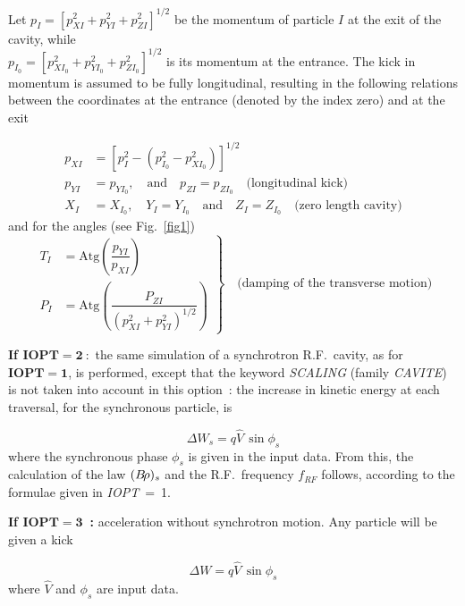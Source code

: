 \noindent Let   $ p_I= \left[p^2_{XI}+p^2_{YI}+p^2_{ZI} \right]^{1/2} $ be the momentum of particle 
$ I $ at the exit of the cavity, while \\ %
$ p_{I_0}= \left[p^2_{XI_0}+p^2_{YI_0} + p^2_{ZI_0}\right]^{1/2} $ is its 
momentum at the entrance. The kick in momentum is assumed to be 
fully longitudinal, resulting in the following relations between 
the coordinates at the entrance (denoted by the index zero) and at the exit 

 \begin{align*}
	 p_{XI} 
	      & = \left[p^2_I-(p^2_{I_0}-p^2_{XI_0}) \right]^{1/2} \\
	p_{YI} & = p_{YI_0},\quad \text{and} \quad  p_{ZI}= p_{ZI_0} \quad\text{(longitudinal  kick)} \\ 
	X_I &  = X_{I_0},\quad Y_I=Y_{I_0}\quad  \text{and} 
	        \quad Z_I=Z_{I_0} \quad\text{(zero  length cavity)}   
 \end{align*}
%
and for the angles (see Fig.~\ref{fig1})  
%
\begin{equation*}
	\left. 
	\begin{aligned}
		T_I & =  \text{Atg} \left( \dfrac{p_{YI}}{ p_{XI}} \right) \\
		P_I &  =  \text{Atg} \left(\dfrac{P_{ZI}}{(p^2_{XI}+p^2_{YI})^{1/2}} \right) 
	\end{aligned}
	 \right\rbrace \quad \text{(damping  of the  transverse  motion)}
\end{equation*}  

\noindent\textbf{If $\mathbf{IOPT  =  2~:}$} the same simulation of a synchrotron R.F.\ cavity, 
as for $\mathbf{IOPT  =  1}$, is performed, except that the keyword 
\textsl{SCALING} (family \textsl{CAVITE}) is not taken into 
account in this option~: the increase in kinetic energy at each traversal, 
for the synchronous particle, is

$$ \Delta W_s= q\hat  V \,\sin\phi_ s $$
%
where the synchronous phase $ \phi_ s $ is given in the input data.
From this, the calculation of the law $ (B\!\rho )_s $ and the R.F.\ frequency 
$f_{RF} $ follows, according to the formulae given in \mbox{\textsl{IOPT}  =  1}. 
\bigskip

\noindent\textbf{If $\mathbf{IOPT  =  3}$~:} acceleration without synchrotron motion. 
Any particle will be given a kick

$$ \Delta W = q\hat  V\, \sin\phi_ s $$
%
where $ \hat  V $ and $ \phi_ s $ are input data.  
\bigskip

